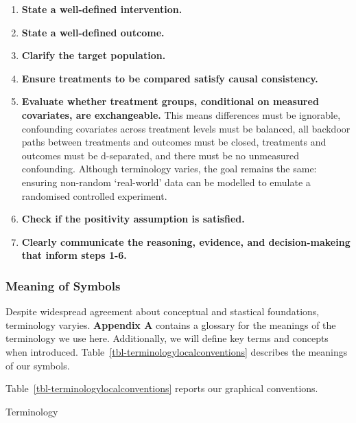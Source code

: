 \documentclass[
  single column]{article}
\providecommand{\tightlist}{%
  \setlength{\itemsep}{0pt}\setlength{\parskip}{0pt}}\usepackage{longtable,booktabs,array}
\begin{document}
\begin{enumerate}
\def\labelenumi{\arabic{enumi}.}
\tightlist
\item
  \textbf{State a well-defined intervention.}
\item
  \textbf{State a well-defined outcome.}
\item
  \textbf{Clarify the target population.}
\item
  \textbf{Ensure treatments to be compared satisfy causal consistency.}
\item
  \textbf{Evaluate whether treatment groups, conditional on measured
  covariates, are exchangeable.} This means differences must be
  ignorable, confounding covariates across treatment levels must be
  balanced, all backdoor paths between treatments and outcomes must be
  closed, treatments and outcomes must be d-separated, and there must be
  no unmeasured confounding. Although terminology varies, the goal
  remains the same: ensuring non-random `real-world' data can be
  modelled to emulate a randomised controlled experiment.
\item
  \textbf{Check if the positivity assumption is satisfied.}
\item
  \textbf{Clearly communicate the reasoning, evidence, and
  decision-makeing that inform steps 1-6.}
\end{enumerate}

\subsubsection{Meaning of Symbols}\label{meaning-of-symbols}

Despite widespread agreement about conceptual and stastical foundations,
terminology varyies. \textbf{Appendix A} contains a glossary for the
meanings of the terminology we use here. Additionally, we will define
key terms and concepts when introduced.
Table~\ref{tbl-terminologylocalconventions} describes the meanings of
our symbols.

Table~\ref{tbl-terminologylocalconventions} reports our graphical
conventions.

\begin{table}

\caption{\label{tbl-terminologylocalconventions}Terminology}

\centering{

\terminologylocalconventions

}

\end{table}%
\end{document}
